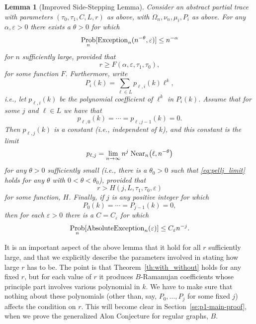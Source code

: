 \documentclass{memo-l}
\theoremstyle{plain}
\theoremstyle{definition}
\numberwithin{section}{chapter}
\numberwithin{equation}{chapter}
\DeclareMathOperator{\Prob}{Prob}
\theoremstyle{plain}
\newtheorem{lem}[theorem]{Lemma}
\theoremstyle{definition}
\begin{document}
\begin{lem}[Improved Side-Stepping Lemma] \label{le:side-step}
\label{LE:SIDE-STEP}  %
Consider an abstract partial trace with
parameters \( (\tau_0,\tau_1,C,L,r) \) as above, with \(
\Omega_n,\nu_n,\mu_i,P_i \) as above.  For any \( \alpha,\varepsilon>0 \)
there exists a \( \theta>0 \) for which
\begin{equation}\label{eq:first_part_of_side}
\Prob_n[ {\rm Exception}_n (n^{-\theta},\varepsilon)] \leq n^{-\alpha}
\end{equation} 
for \( n \) sufficiently large,
provided that
$$
r\ge F(\alpha,\varepsilon,\tau_1,\tau_0),
$$
for some function $F$.
Furthermore, write \[ P_i(k) = \sum_{\ell\in L} p_{\ell,i}(k) \ell^k, \]
i.e., let \( p_{\ell,i}(k) \) be the polynomial coefficient of \( \ell^k \)
in \( P_i(k) \).  Assume that for some \( j \) and \( \ell\in L \) we have
that \[ p_{\ell,0}(k)=\cdots=p_{\ell,j-1}(k)=0.  \] Then \( p_{\ell,j}(k)
\) is a constant (i.e., independent of \( k \)), and this constant is the
limit \begin{equation}\label{eq:pellj_limit} p_{\ell,j}= \lim_{n\to\infty}
n^j \;  {\rm Near}_n\bigl(\ell,n^{-\theta} \bigr)  \end{equation} for any
\( \theta>0 \) sufficiently small (i.e., there is a \( \theta_0>0 \) such
that \eqref{eq:pellj_limit} holds for any \( \theta \) with \(
0<\theta<\theta_0 \)), provided that
\begin{equation}\label{eq:H_defined}
r > H(j,L,\tau_1,\tau_0,\varepsilon)
\end{equation}
for some function, $H$.
Finally, if \( j \) is any positive integer for which \[ P_0(k) = \cdots =
P_{j-1}(k) = 0, \] then for each \( \varepsilon>0 \) there is a \(
C=C_\varepsilon \) for which \begin{equation}\label{eq:final_side} \Prob_n[
{\rm AbsoluteException}_n(\varepsilon) ] \leq C_\varepsilon n^{-j} .
\end{equation} \end{lem}

It is an important aspect of the above lemma that it hold for all $r$
sufficiently large, and that we explicitly describe the parameters
involved in stating how large $r$ has to be.  The point is that
Theorem~\ref{th:with_without} holds for any fixed $r$, but for each value of
$r$ it produces $B$-Ramanujan coefficients whose principle part
involves various polynomial in $k$.
We have to make sure that nothing about these polynomials
(other than, say, $P_0,\ldots,P_j$ for some fixed $j$) affects the
condition on $r$.  This will become clear in Section~\ref{se:p1-main-proof},
when we prove the generalized Alon Conjecture for regular graphs, $B$.
\end{document}
